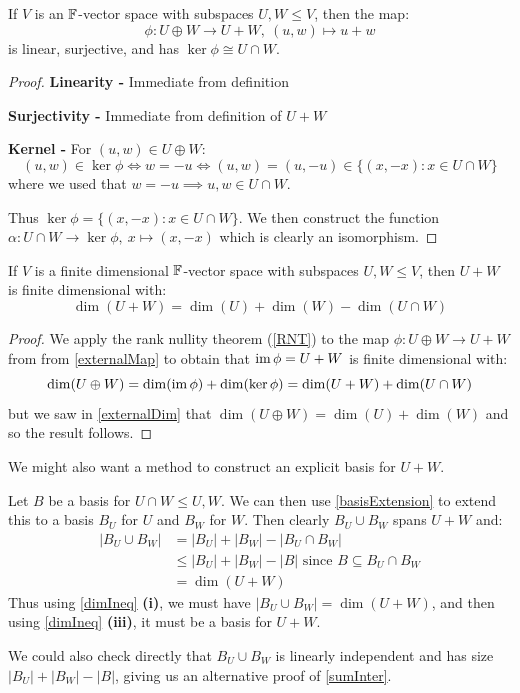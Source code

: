 \documentclass[../main.tex]{subfiles}
\begin{document}
\begin{proposition}
  If $V$ is an $\mathbb{F}$-vector space with subspaces $U, W \leq V$, then the map: \label{externalMap}
  \[
    \phi: U \oplus W \to U + W,\ (u, w) \mapsto u + w
  \]
  is linear, surjective, and has $\ker \phi \cong U \cap W$.
\end{proposition}
\begin{proof}
  \textbf{Linearity -} Immediate from definition \par
  \textbf{Surjectivity -} Immediate from definition of $U + W$ \par
  \textbf{Kernel -}
  For $(u, w) \in U \oplus W$:
  \[
    (u, w) \in \ker \phi \iff w = - u \iff (u, w) = (u, -u) \in \{(x, -x): x \in U \cap W\}
  \]
  where we used that $w = -u \implies u, w \in U \cap W$.

  Thus $\ker \phi = \{(x, -x): x \in U \cap W\}$.
  We then construct the function $\alpha: U \cap W \to \ker \phi,\ x \mapsto (x, -x)$ which is clearly an isomorphism.
\end{proof}
\begin{corollary}
  If $V$ is a finite dimensional $\mathbb{F}$-vector space with subspaces $U, W \leq V$, then $U + W$ is finite dimensional with: \label{sumInter}
  \[
    \dim(U + W) = \dim(U) + \dim(W) - \dim(U \cap W)
  \]
\end{corollary}
\begin{proof}
  We apply the rank nullity theorem (\cref{RNT}) to the map $\phi: U \oplus W \to U + W$ from from \cref{externalMap} to obtain that $\operatorname{im} \phi = U + W$ is finite dimensional with:
  \[
    \dim(U \oplus W) = \dim(\operatorname{im} \phi) + \dim(\ker \phi) = \dim(U + W) + \dim(U \cap W)
  \]
  but we saw in \cref{externalDim} that $\dim(U \oplus W) = \dim(U) + \dim(W)$ and so the result follows.
\end{proof}
We might also want a method to construct an explicit basis for $U + W$.

Let $B$ be a basis for $U \cap W \leq U, W$.
We can then use \cref{basisExtension} to extend this to a basis $B_U$ for $U$ and $B_W$ for $W$.
Then clearly $B_U \cup B_W$ spans $U + W$ and:
\begin{align*}
  |B_{U} \cup B_{W}| &= |B_U| + |B_W| - |B_U \cap B_W| \\
                     &\leq |B_U| + |B_W| - |B| \text{ since $B \subseteq B_U \cap B_W$}\\
                     &= \dim(U + W)
\end{align*}
Thus using \cref{dimIneq} \textbf{(i)}, we must have $|B_U \cup B_W| = \dim(U + W)$, and then using \cref{dimIneq} \textbf{(iii)}, it must be a basis for $U + W$.
\begin{remark}
  We could also check directly that $B_U \cup B_W$ is linearly independent and has size $|B_U| + |B_W| - |B|$, giving us an alternative proof of \cref{sumInter}.
\end{remark}
\end{document}
